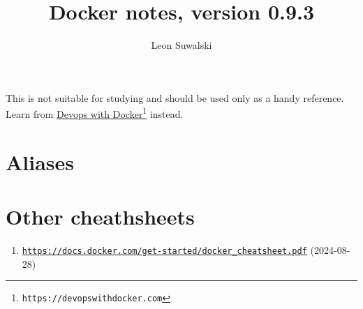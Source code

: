 \documentclass{charun}
\title{Docker notes, version 0.9.3}
\author{Leon Suwalski}
\begin{document}
\begin{multicols}{2}
\maketitle
\raggedright

This is not suitable for studying and should be used only as a handy reference.
Learn from \href{https://devopswithdocker.com}{\underline{Devops with Docker}}\footnote{\texttt{https://devopswithdocker.com}} instead.










\section{Aliases}


\section{Other cheathsheets}
\begin{enumerate}
    \item \footnotesize{\href{https://docs.docker.com/get-started/docker_cheatsheet.pdf}{\texttt{https://docs.docker.com/get-started/docker\_cheatsheet.pdf}} (2024-08-28)}
\end{enumerate}

\end{multicols}
\end{document}
